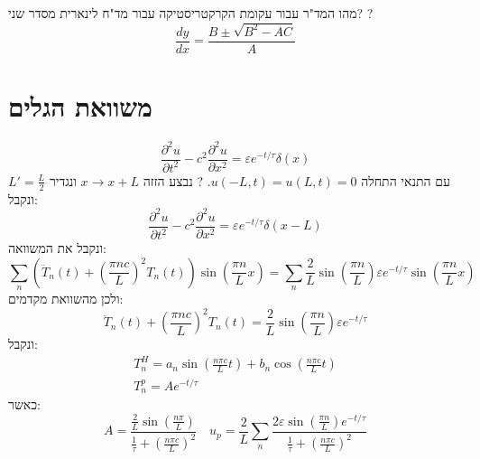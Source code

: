 \documentclass{tstextbook}
\begin{document}
מהו המד"ר עבור עקומת הקרקטריסטיקה עבור מד"ח לינארית מסדר שני?
?
$$\frac{dy}{dx}=\frac{B\pm\sqrt{B^2-AC}}{A}$$

\section{משוואת הגלים}

$$\frac{\partial ^2 u}{\partial t^2}-c^2 \frac{\partial ^2u}{\partial x^2}=\varepsilon e^{-t/\tau} \delta(x)$$
עם התנאי התחלה \(u(-L,t)=u(L,t)=0\).
?
נבצע הזזה \(x\to x+L\) ונגדיר \(L'=\frac{L}{2}\) ונקבל:
$$\frac{\partial ^2u}{\partial t^2}-c^2\frac{\partial ^2u}{\partial x^2}=\varepsilon e^{-t/\tau}\delta(x-L)$$
ונקבל את המשוואה:
$$\sum_{n}\left( \ddot{T}_{n}(t)+\left( \frac{\pi nc}{L} \right)^2T_{n}(t) \right)\sin\left( \frac{\pi n}{L}x \right)=\sum_{n} \frac{2}{L}\sin\left( \frac{\pi n}{L} \right)\varepsilon e^{-t/\tau}\sin\left( \frac{\pi n}{L}x \right)$$
ולכן מהשוואת מקדמים:
$$\ddot{T}_{n}(t)+\left( \frac{\pi nc}{L} \right)^2T_{n}(t) = \frac{2}{L}\sin\left( \frac{\pi n}{L} \right)\varepsilon e^{-t/\tau}$$
ונקבל:
\begin{gather*}T_{n}^H=a_{n}\sin\left( \frac{n\pi c}{L}t \right)+b_{n}\cos\left( \frac{n\pi c}{L}t \right) \\T_{n}^p=Ae^{-t/\tau}
\end{gather*}
כאשר:
$$A=\frac{\frac{2}{L}\sin\left( \frac{n\pi}{L} \right)}{\frac{1}{\tau}+\left( \frac{n\pi c}{L} \right)^2}\quad u_{p}=\frac{2}{L}\sum_{n}\frac{2\varepsilon\sin\left(  \frac{\pi n}{L}\right)e^{-t/\tau}}{\frac{1}{\tau}+(\frac{n\pi c}{L})^2}$$
\end{document}
